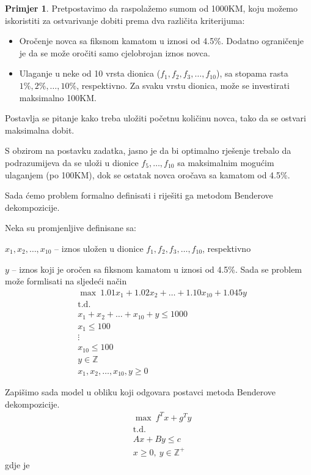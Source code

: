 \documentclass[a4paper, utf8, 11pt, colorlinks]{book}
\theoremstyle{definition}
\newtheorem{primjer}{Primjer}[chapter]
\begin{document}
\begin{primjer} Pretpostavimo da raspolažemo sumom od 1000KM, koju možemo iskoristiti za ostvarivanje dobiti prema dva različita kriterijuma:
	\end{primjer}
\begin{itemize}
	\item Oročenje novca sa fiksnom kamatom u iznosi od 4.5\%. Dodatno ograničenje je da se može oročiti samo cjelobrojan iznos novca.
	
	\item Ulaganje u neke od 10 vrsta dionica ($f_1, f_2, f_3,\ldots,f_{10}$), sa stopama rasta $1\%,2\%,\ldots,10\%$, respektivno. Za svaku vrstu dionica, može se investirati maksimalno 100KM.
\end{itemize}
Postavlja se pitanje kako treba uložiti početnu količinu novca, tako da se ostvari maksimalna dobit.

S obzirom na postavku zadatka, jasno je da bi optimalno rješenje trebalo da podrazumijeva da se uloži u dionice $f_5,\ldots,f_{10}$ sa maksimalnim mogućim ulaganjem (po 100KM), dok se ostatak novca oročava sa kamatom od  4.5\%.

Sada ćemo problem formalno definisati i riješiti ga metodom Benderove dekompozicije.

Neka su promjenljive definisane sa:

$x_1,x_2,\ldots,x_{10}$ -- iznos uložen u dionice $f_1, f_2, f_3,\ldots,f_{10}$, respektivno

$y$ -- iznos koji je oročen sa fiksnom kamatom u iznosi od 4.5\%. Sada se problem može formlisati na sljedeći način
\begin{equation}\label{primer:formulacija1}
	\begin{aligned}
		&\max\ 1.01x_1+1.02x_2+\ldots+1.10x_{10}+1.045y\\
		&\mbox{t.d.}\\ 
		&x_1+x_2+\ldots+x_{10}+y\leqslant1000\\
		&x_1\leqslant 100\\
		&\vdots \\
		&x_{10}\leqslant 100\\
		&y\in \mathbb{Z}\\
		&x_1,x_2,\ldots,x_{10},y\geqslant 0
	\end{aligned}
\end{equation}

Zapišimo sada model u obliku koji odgovara postavci metoda Benderove dekompozicije.
 \begin{equation}\label{primer:formulacija2}
	\begin{aligned}
		&\max\  f^Tx+g^Ty\\
			&\mbox{t.d.}\\ 
		  &Ax+By\leqslant c\\
		&x\geqslant 0,\ y \in \mathbb{Z}^+
	\end{aligned}
\end{equation}
gdje je
\end{document}

